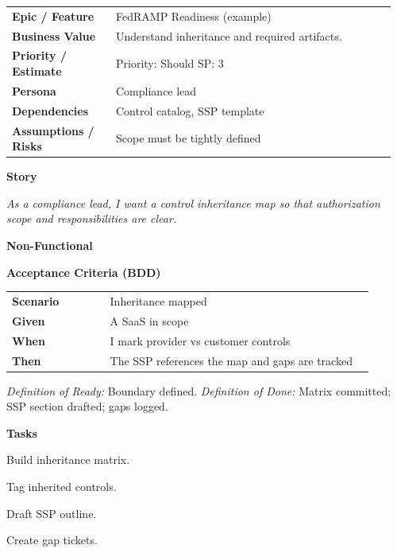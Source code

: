 \documentclass[11pt,letterpaper]{article}
\makeatletter
\newenvironment{kvtable}{%
  \par\noindent\begin{tabular}{@{}>{\raggedright\bfseries\arraybackslash}p{0.26\linewidth} >{\raggedright\arraybackslash}p{0.70\linewidth}@{}}
}{\end{tabular}\par}
\newenvironment{bdd}{%
  \par\noindent\begin{tabular}{@{}>{\raggedright\bfseries\arraybackslash}p{0.26\linewidth} >{\raggedright\arraybackslash}p{0.70\linewidth}@{}}
}{\end{tabular}\par}
\newcommand{\DoRDoD}[2]{%
  \vspace{0.35em}
  {\footnotesize\color{Muted}%
    \textit{Definition of Ready:} #1 \; \textbullet\;
    \textit{Definition of Done:} #2%
  }%
}
\newenvironment{storycard}[2]{%
  \begin{tcolorbox}[cloudcard, title={#1 --- #2}]%
}{\end{tcolorbox}}
\newcommand{\sectionlabel}[1]{\par\vspace{0.35em}\textbf{#1}\par}
\makeatother
\begin{document}
\begin{storycard}{CCS-27}{Ch. 27 — Government Certification \& Accreditation}
\begin{kvtable}
Epic / Feature & FedRAMP Readiness (example)\\
Business Value & Understand inheritance and required artifacts.\\
Priority / Estimate & Priority: Should \quad SP: 3\\
Persona & Compliance lead\\
Dependencies & Control catalog, SSP template\\
Assumptions / Risks & Scope must be tightly defined\\
\end{kvtable}
\sectionlabel{Story}
\textit{As a compliance lead, I want a control inheritance map so that authorization scope and responsibilities are clear.}
\sectionlabel{Non-Functional}\;
\sectionlabel{Acceptance Criteria (BDD)}
\begin{bdd}
Scenario & Inheritance mapped\\
Given & A SaaS in scope\\
When & I mark provider vs customer controls\\
Then & The SSP references the map and gaps are tracked\\
\end{bdd}
\DoRDoD{Boundary defined.}{Matrix committed; SSP section drafted; gaps logged.}
\sectionlabel{Tasks}
\begin{checklist}
\item Build inheritance matrix.
\item Tag inherited controls.
\item Draft SSP outline.
\item Create gap tickets.
\end{checklist}
\end{storycard}
\end{document}
